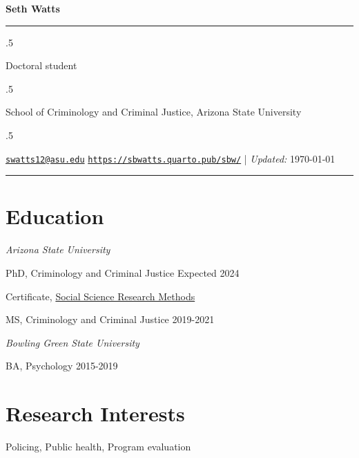 \documentclass[11pt,]{article}
\begin{document}
\centerline{\huge \bf Seth Watts}

\vspace{2 mm}

\hrule

\vspace{2 mm}

\moveleft.5\hoffset\centerline{Doctoral student}
\moveleft.5\hoffset\centerline{School of Criminology and Criminal
Justice, Arizona State University}
\moveleft.5\hoffset\centerline{ \faEnvelopeO \hspace{1 mm} \href{mailto:}{\tt \href{mailto:swatts12@asu.edu}{\nolinkurl{swatts12@asu.edu}}} \hspace{1 mm}      \faGlobe \hspace{1 mm} \href{http://\url{https://sbwatts.quarto.pub/sbw/}}{\tt \url{https://sbwatts.quarto.pub/sbw/}}    | \emph{Updated:} \apstylekinda\today} 

\vspace{2 mm}

\hrule


\pagestyle{plain}
\vspace{4mm}

\hypertarget{education}{%
\section{Education}\label{education}}

\emph{Arizona State University}

PhD, Criminology and Criminal Justice \hfill Expected 2024

Certificate,
\href{https://degrees.apps.asu.edu/masters-phd/major/ASU00/LASSRMGRCT/social-science-research-methods-graduate-certificate}{Social
Science Research Methods}

MS, Criminology and Criminal Justice \hfill 2019-2021

\emph{Bowling Green State University}

BA, Psychology \hfill 2015-2019

\vspace{2mm}

\hypertarget{research-interests}{%
\section{Research Interests}\label{research-interests}}

Policing, Public health, Program evaluation

\vspace{2mm}
\end{document}
